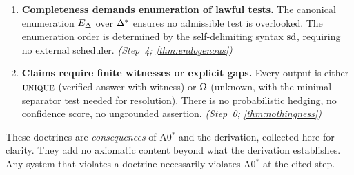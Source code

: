 \begin{enumerate}[label=\textbf{D\arabic*.}]
  \item \textbf{Completeness demands enumeration of lawful tests.}
        The canonical enumeration $E_\Delta$ over $\Delta^*$ ensures no
        admissible test is overlooked.  The enumeration order is determined
        by the self-delimiting syntax $\mathrm{sd}$, requiring no external
        scheduler.
        \hfill\emph{(Step~4; \cref{thm:endogenous})}

  \item \textbf{Claims require finite witnesses or explicit gaps.}
        Every output is either $\textsc{unique}$ (verified answer with witness) or
        $\Omega$ (unknown, with the minimal separator test needed for
        resolution).  There is no probabilistic hedging, no confidence
        score, no ungrounded assertion.
        \hfill\emph{(Step~0; \cref{thm:nothingness})}
\end{enumerate}

\begin{remark}
These doctrines are \emph{consequences} of A0$^*$ and the derivation, collected
here for clarity.  They add no axiomatic content beyond what the derivation
establishes.  Any system that violates a doctrine necessarily violates A0$^*$ at
the cited step.
\end{remark}
